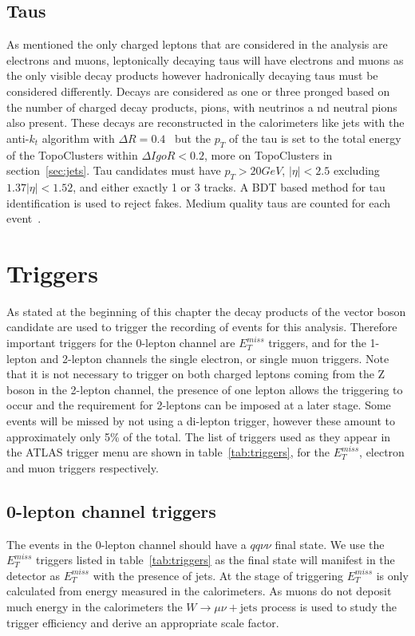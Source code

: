 \subsection{Taus}

As mentioned the only charged leptons that are considered in the analysis are
electrons and muons, leptonically decaying taus will have electrons and muons as
the only visible decay products however hadronically decaying taus must be
considered differently. Decays are considered as one or three pronged based on
the number of charged decay products, pions, with neutrinos a
nd neutral pions
also present. These decays are reconstructed in the calorimeters like jets with
the anti-$k_t$ algorithm with $\Delta R = 0.4$~\cite{tau-reco} but the $p_T$ of
the tau is set to the total energy of the TopoClusters within $\Delta I goR < 0.2$,
more on TopoClusters in section~\ref{sec:jets}. Tau candidates must have $p_T >
20 GeV$, $\lvert  \eta \rvert < 2.5$ excluding $1.37 \lvert \eta \rvert < 1.52$,
and either exactly 1 or 3 tracks. A BDT based method for tau identification is
used to reject fakes. Medium quality taus are counted for each event~\cite{med-taus2}.

\section{Triggers}
\label{sec:triggers}

As stated at the beginning of this chapter the decay products of the vector
boson candidate are used to trigger the recording of events for this analysis.
Therefore important triggers for the 0-lepton channel are $E_T^{miss}$ triggers,
and for the 1-lepton and 2-lepton channels the single electron, or single muon
triggers. Note that it is not necessary to trigger on both charged leptons
coming from the Z boson in the 2-lepton channel, the presence of one lepton
allows the triggering to occur and the requirement for 2-leptons can be imposed
at a later stage. Some events will be missed by not using a di-lepton trigger,
however these amount to approximately only 5\% of the total. The list of
triggers used as they appear in the ATLAS trigger menu are shown in
table~\ref{tab:triggers}, for the $E_T^{miss}$, electron and muon triggers
respectively.


\subsection{0-lepton channel triggers}
The events in the 0-lepton channel should have a $qq\nu\nu$ final state. We use
the $E_T^{miss}$ triggers listed in table~\ref{tab:triggers} as the final state
will manifest in the detector as $E_T^{miss}$ with the presence of jets. At the
stage of triggering $E_T^{miss}$ is only calculated from energy measured in the
calorimeters. As muons do not deposit much energy in the calorimeters the $W
\rightarrow \mu \nu + \text{jets}$ process is used to study the trigger
efficiency and derive an appropriate scale factor.


